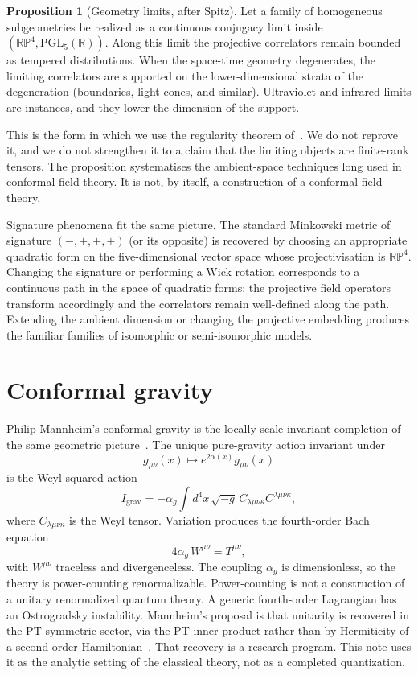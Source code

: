 \documentclass{article}
\theoremstyle{definition}
\newtheorem{proposition}{Proposition}
\newcommand{\RP}{\mathbb{RP}}
\newcommand{\R}{\mathbb{R}}
\newcommand{\PGL}{\mathrm{PGL}}
\begin{document}
\begin{proposition}[Geometry limits, after Spitz]
\label{prop:limits}
Let a family of homogeneous subgeometries be realized as a continuous
conjugacy limit inside \((\RP^4,\PGL_5(\R))\).  Along this limit the
projective correlators remain bounded as tempered distributions.  When the
space-time geometry degenerates, the limiting correlators are supported on
the lower-dimensional strata of the degeneration (boundaries, light cones,
and similar).  Ultraviolet and infrared limits are instances, and they lower
the dimension of the support.
\end{proposition}

\noindent
This is the form in which we use the regularity theorem of~\cite{Spitz2024}.
We do not reprove it, and we do not strengthen it to a claim that the
limiting objects are finite-rank tensors.  The proposition systematises the
ambient-space techniques long used in conformal field theory.  It is not, by
itself, a construction of a conformal field theory.

Signature phenomena fit the same picture.  The standard Minkowski metric of
signature \((-,+,+,+)\) (or its opposite) is recovered by choosing an appropriate
quadratic form on the five-dimensional vector space whose projectivisation is
\(\RP^4\).  Changing the signature or performing a Wick rotation corresponds to
a continuous path in the space of quadratic forms; the projective field operators
transform accordingly and the correlators remain well-defined along the path.
Extending the ambient dimension or changing the projective embedding produces
the familiar families of isomorphic or semi-isomorphic models.

\section{Conformal gravity}

Philip Mannheim's conformal gravity is the locally scale-invariant completion
of the same geometric picture~\cite{Mannheim2011}.  The unique pure-gravity
action invariant under
\[
g_{\mu\nu}(x)\mapsto e^{2\alpha(x)}g_{\mu\nu}(x)
\]
is the Weyl-squared action
\[
I_{\mathrm{grav}}
  = -\alpha_g\int d^4x\,\sqrt{-g}\,
    C_{\lambda\mu\nu\kappa}C^{\lambda\mu\nu\kappa},
\]
where \(C_{\lambda\mu\nu\kappa}\) is the Weyl tensor.  Variation produces the
fourth-order Bach equation
\[
4\alpha_g\,W^{\mu\nu}=T^{\mu\nu},
\]
with \(W^{\mu\nu}\) traceless and divergenceless.  The coupling \(\alpha_g\) is
dimensionless, so the theory is power-counting renormalizable.  Power-counting
is not a construction of a unitary renormalized quantum theory.  A generic
fourth-order Lagrangian has an Ostrogradsky instability.  Mannheim's proposal
is that unitarity is recovered in the \(\mathrm{PT}\)-symmetric sector, via
the \(\mathrm{PT}\) inner product rather than by Hermiticity of a second-order
Hamiltonian~\cite{Mannheim2011,BenderMannheim}.  That recovery is a research
program.  This note uses it as the analytic setting of the classical theory,
not as a completed quantization.
\end{document}
